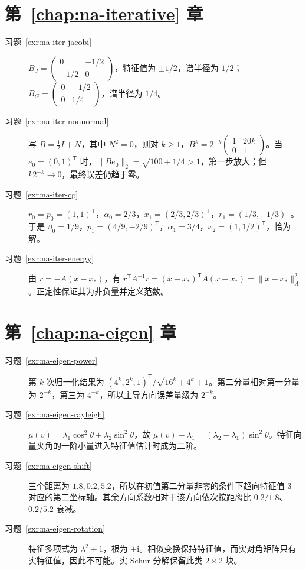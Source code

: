 \section{第~\ref{chap:na-iterative} 章}
\begin{description}
\item[习题~\ref{exr:na-iter-jacobi}] $B_J=\begin{pmatrix}0&-1/2\\-1/2&0\end{pmatrix}$，特征值为 $\pm1/2$，谱半径为 $1/2$；$B_G=\begin{pmatrix}0&-1/2\\0&1/4\end{pmatrix}$，谱半径为 $1/4$。
\item[习题~\ref{exr:na-iter-nonnormal}] 写 $B=\tfrac12I+N$，其中 $N^2=0$，则对 $k\ge1$，$B^k=2^{-k}\begin{pmatrix}1&20k\\0&1\end{pmatrix}$。当 $e_0=(0,1)^{\mathsf T}$ 时，$\|Be_0\|_2=\sqrt{100+1/4}>1$，第一步放大；但 $k2^{-k}\to0$，最终误差仍趋于零。
\item[习题~\ref{exr:na-iter-cg}] $r_0=p_0=(1,1)^{\mathsf T}$，$\alpha_0=2/3$，$x_1=(2/3,2/3)^{\mathsf T}$，$r_1=(1/3,-1/3)^{\mathsf T}$。于是 $\beta_0=1/9$，$p_1=(4/9,-2/9)^{\mathsf T}$，$\alpha_1=3/4$，$x_2=(1,1/2)^{\mathsf T}$，恰为解。
\item[习题~\ref{exr:na-iter-energy}] 由 $r=-A(x-x_*)$，有 $r^{\mathsf T}A^{-1}r=(x-x_*)^{\mathsf T}A(x-x_*)=\|x-x_*\|_A^2$。正定性保证其为非负量并定义范数。
\end{description}

\section{第~\ref{chap:na-eigen} 章}
\begin{description}
\item[习题~\ref{exr:na-eigen-power}] 第 $k$ 次归一化结果为 $(4^k,2^k,1)^{\mathsf T}/\sqrt{16^k+4^k+1}$。第二分量相对第一分量为 $2^{-k}$，第三为 $4^{-k}$，所以主导方向误差量级为 $2^{-k}$。
\item[习题~\ref{exr:na-eigen-rayleigh}] $\mu(v)=\lambda_1\cos^2\theta+\lambda_2\sin^2\theta$，故 $\mu(v)-\lambda_1=(\lambda_2-\lambda_1)\sin^2\theta$。特征向量夹角的一阶小量进入特征值估计时成为二阶。
\item[习题~\ref{exr:na-eigen-shift}] 三个距离为 $1.8,0.2,5.2$，所以在初值第二分量非零的条件下趋向特征值 $3$ 对应的第二坐标轴。其余方向系数相对于该方向依次按距离比 $0.2/1.8$、$0.2/5.2$ 衰减。
\item[习题~\ref{exr:na-eigen-rotation}] 特征多项式为 $\lambda^2+1$，根为 $\pm\mathrm i$。相似变换保持特征值，而实对角矩阵只有实特征值，因此不可能。实 Schur 分解保留此类 $2\times2$ 块。
\end{description}

